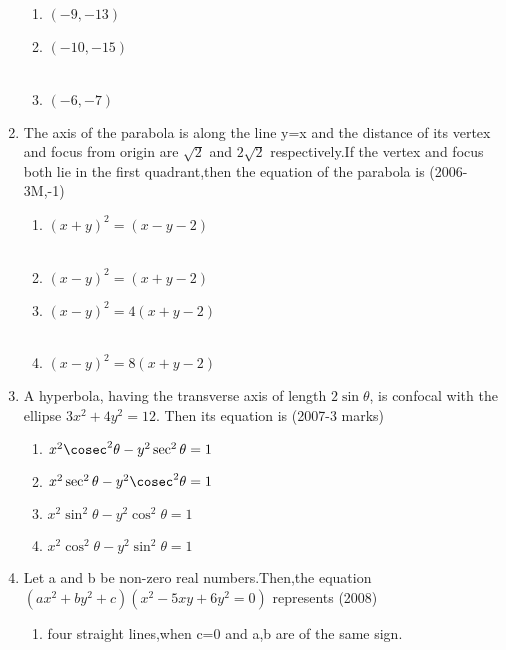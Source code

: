 \begin{enumerate}
\begin{multicols}{2}
\begin{enumerate}
    \item${(-9,-13)}$
    \item${(-10,-15)}$\\\\
    \item${(-6,-7)}$
\end{enumerate}
\end{multicols}
\item The axis of the parabola is along the line y=x and the distance of its vertex and focus from  origin are $\sqrt2$ and $2\sqrt2$  respectively.If the vertex and focus both lie in the first quadrant,then the equation of the parabola is \hfill{(2006-3M,-1)}
\begin{multicols}{2}
\begin{enumerate}
    \item $(x+y)^{2}=(x-y-2)$\\\\
    \item $(x-y)^{2}=(x+y-2)$
    \item $(x-y)^{2}=4(x+y-2)$\\\\
    \item $(x-y)^{2}=8(x+y-2)$
\end{enumerate}
\end{multicols}
\item A hyperbola, having the transverse axis of length $2\sin\theta$, is confocal with the ellipse $3x^{2}+4y^{2}=12$. Then its equation is \hfill{(2007-3 marks)}
\begin{enumerate}
    \item ${x^{2}\cosec^{2}\theta}-{y^{2}\sec^{2}\theta=1}$\\
    \item $x^{2}\sec^{2}\theta-y^{2}\cosec^{2}\theta=1$\\
    \item $x^{2}\sin^{2}\theta-y^{2}\cos^{2}\theta=1$\\
    \item $x^{2}\cos^{2}\theta-y^{2}\sin^{2}\theta=1$\\
\end{enumerate}
\item Let a and b be non-zero real numbers.Then,the equation $(ax^{2}+by^{2}+c)(x^{2}-5xy+6y^{2}=0)$ represents \hfill{(2008)}
\begin{enumerate}
    \item four straight lines,when c=0 and a,b are of the same sign.\\

\end{enumerate}
\end{enumerate}
